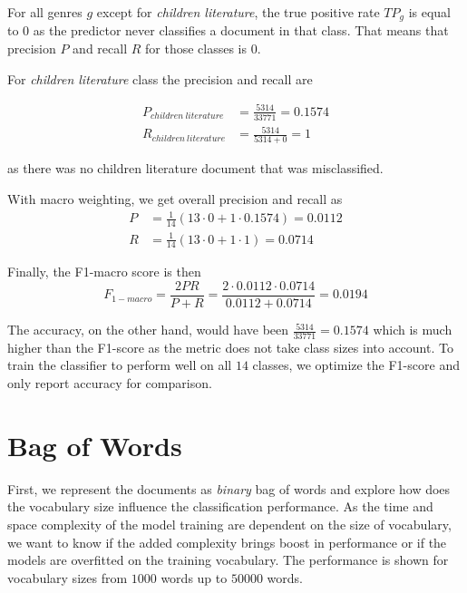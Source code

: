 For all genres $g$ except for \textit{children literature}, the true positive rate $TP_g$ is equal to $0$ as the predictor never classifies a document in that class. That means that precision $P$ and recall $R$ for those classes is $0$.

For \textit{children literature} class the precision and recall are

\begin{equation}
	\begin{split}
		P_{children\ literature} & = \frac{5314}{33771} = 0.1574 \\
		R_{children\ literature} & = \frac{5314}{5314 + 0} = 1
	\end{split}
\end{equation}

as there was no children literature document that was misclassified.

With macro weighting, we get overall precision and recall as 
\begin{equation}
	\begin{split}
	P  & = \frac{1}{14}(13 \cdot 0 + 1 \cdot 0.1574)  = 0.0112 \\
	R & = \frac{1}{14}(13 \cdot 0 + 1 \cdot 1)   = 0.0714
	\end{split}
\end{equation}

Finally, the F1-macro score is then
$$ F_{1-macro} =  \frac{2PR}{P+R} = \frac{2 \cdot 0.0112 \cdot 0.0714}{ 0.0112 + 0.0714} = 0.0194$$

The accuracy, on the other hand, would have been $\frac{5314}{33771} = 0.1574$ which is much higher than the F1-score as the metric does not take class sizes into account. To train the classifier to perform well on all $14$ classes, we optimize the F1-score and only report accuracy for comparison.


\section{Bag of Words}
First, we represent the documents as \textit{binary} bag of words and explore how does the vocabulary size influence the classification performance. As the time and space complexity of the model training are dependent on the size of vocabulary, we want to know if the added complexity brings boost in performance or if the models are overfitted on the training vocabulary. The performance is shown for vocabulary sizes from $1000$ words up to $50000$ words.

